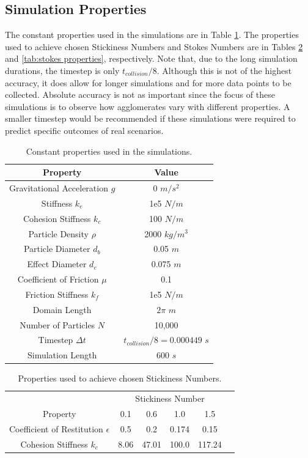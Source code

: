 \documentclass[a4paper,11pt,titlepage]{report}
\begin{document}
\subsection{Simulation Properties}
The constant properties used in the simulations are in Table \ref{tab:simulation properties}. The properties used to achieve chosen Stickiness Numbers and Stokes Numbers are in Tables \ref{tab:stickiness properties} and \ref{tab:stokes properties}, respectively. Note that, due to the long simulation durations, the timestep is only $t_{collision} / 8$. Although this is not of the highest accuracy, it does allow for longer simulations and for more data points to be collected. Absolute accuracy is not as important since the focus of these simulations is to observe how agglomerates vary with different properties. A smaller timestep would be recommended if these simulations were required to predict specific outcomes of real scenarios.
\begin{table}[!htb]
\centering
\begin{tabular}{| c c |}
\hline
Property & Value\\
\hline
Gravitational Acceleration $g$ & 0 $m/s^2$ \\
Stiffness $k_e$ & 1e5 $N/m$ \\
Cohesion Stiffness $k_c$ & 100 $N/m$ \\
Particle Density $\rho$ & 2000 $kg/m^3$ \\
Particle Diameter $d_b$ & 0.05 $m$ \\
Effect Diameter $d_e$ & 0.075 $m$ \\
Coefficient of Friction $\mu$ & 0.1 \\
Friction Stiffness $k_f$ & 1e5 $N/m$ \\
Domain Length & $2\pi$ $m$ \\
Number of Particles $N$ & 10,000 \\
Timestep $\Delta t$ & $t_{collision} / 8 = 0.000449$ $s$ \\
Simulation Length & 600 $s$ \\
\hline
\end{tabular}
\caption{Constant properties used in the simulations.}
\label{tab:simulation properties}
\end{table}
\begin{table}[!htb]
\centering
\begin{tabular}{| c c c c c c |}
\hline
& \multicolumn{4}{c}{Stickiness Number} &\\
Property & 0.1 & 0.6 & 1.0 & 1.5 & \\
\hline
Coefficient of Restitution $\epsilon$ & 0.5 & 0.2 & 0.174 & 0.15 & \\
Cohesion Stiffness $k_c$ & 8.06 & 47.01 & 100.0 & 117.24 & \\
\hline
\end{tabular}
\caption{Properties used to achieve chosen Stickiness Numbers.}
\label{tab:stickiness properties}
\end{table}
\end{document}
